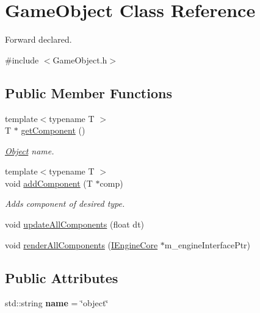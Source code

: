 \hypertarget{class_game_object}{\section{Game\+Object Class Reference}
\label{class_game_object}
}


Forward declared.  




{\ttfamily \#include $<$Game\+Object.\+h$>$}

\subsection*{Public Member Functions}
\begin{DoxyCompactItemize}
\item 
{\footnotesize template$<$typename T $>$ }\\T $\ast$ \hyperlink{class_game_object_a1c50376c7f24439359a3962f57dfd513}{get\+Component} ()
\begin{DoxyCompactList}\small\item\em \hyperlink{class_object}{Object} name. \end{DoxyCompactList}\item 
\hypertarget{class_game_object_aff400b6c6e3c6af0b42fe49adb786174}{{\footnotesize template$<$typename T $>$ }\\void \hyperlink{class_game_object_aff400b6c6e3c6af0b42fe49adb786174}{add\+Component} (T $\ast$comp)}\label{class_game_object_aff400b6c6e3c6af0b42fe49adb786174}

\begin{DoxyCompactList}\small\item\em Adds component of desired type. \end{DoxyCompactList}\item 
void \hyperlink{class_game_object_a9f4d3988cee6c0dd1a2846d92265359e}{update\+All\+Components} (float dt)
\item 
void \hyperlink{class_game_object_a3e93bca635ff45cef4f4853545c1b2c4}{render\+All\+Components} (\hyperlink{class_i_engine_core}{I\+Engine\+Core} $\ast$m\+\_\+engine\+Interface\+Ptr)
\end{DoxyCompactItemize}
\subsection*{Public Attributes}
\begin{DoxyCompactItemize}
\item 
\hypertarget{class_game_object_af542b33c8de269343e22c5629e6b66c0}{std\+::string {\bfseries name} = \char`\"{}object\char`\"{}}\label{class_game_object_af542b33c8de269343e22c5629e6b66c0}

\end{DoxyCompactItemize}


